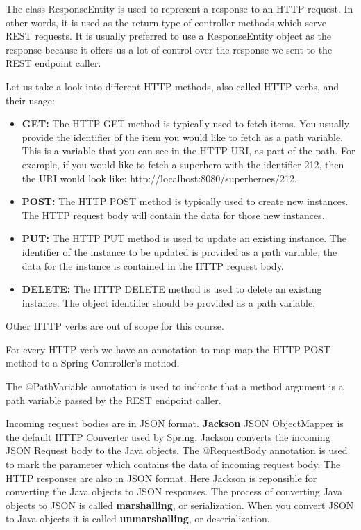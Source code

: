 The class ResponseEntity is used to represent a response to an HTTP request. In other words, it is used as the return type of controller methods which serve REST requests. It is usually preferred to use a ResponseEntity object as the response because it offers us a lot of control over the response we sent to the REST endpoint caller.

Let us take a look into different HTTP methods, also called HTTP verbs, and their usage: 

\begin{itemize}
\item \textbf{GET:} The HTTP GET method is typically used to fetch items. You usually provide the identifier of the item you would like to fetch as a path variable. This is a variable that you can see in the HTTP URI, as part of the path. For example, if you would like to fetch a superhero with the identifier 212, then the URI would look like: http://localhost:8080/superheroes/212.
\item \textbf{POST:} The HTTP POST method is typically used to create new instances. The HTTP request body will contain the data for those new instances. 
\item \textbf{PUT:} The HTTP PUT method is used to update an existing instance.  The identifier of the instance to be updated is provided as a path variable, the data for the instance is contained in the HTTP request body. 
\item \textbf{DELETE:} The HTTP DELETE method is used to delete an existing instance. The object identifier should be provided as a path variable.
\end{itemize}

Other HTTP verbs are out of scope for this course.

For every HTTP verb we have an annotation to map map the HTTP POST method to a Spring Controller’s method.

The @PathVariable annotation is used to indicate that a method argument is a path variable passed by the REST endpoint caller. 

Incoming request bodies are in JSON format.  \textbf{Jackson} JSON ObjectMapper is the default HTTP Converter used by Spring.  Jackson converts the incoming JSON Request body to the Java objects.  The @RequestBody annotation is used to mark the parameter which contains the data of incoming request body.
The HTTP responses are also in JSON format. Here Jackson is reponsible for converting the Java objects to JSON responses. 
The process of converting Java objects to JSON is called \textbf{marshalling}, or serialization. When you convert JSON to Java objects it is called \textbf{unmarshalling},  or deserialization.

